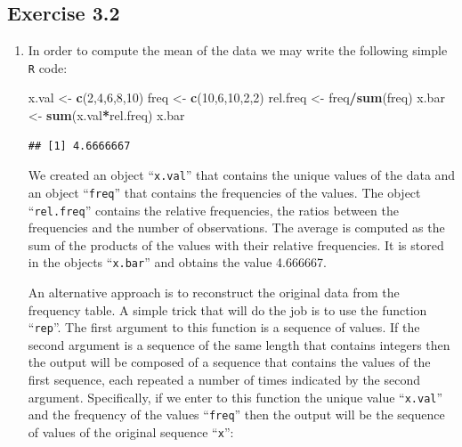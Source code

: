 \documentclass[]{krantz}
\makeatletter
\newenvironment{Shaded}{\begin{snugshade}}{\end{snugshade}}
\newcommand{\KeywordTok}[1]{\textcolor[rgb]{0.13,0.29,0.53}{\textbf{#1}}}
\newcommand{\DecValTok}[1]{\textcolor[rgb]{0.00,0.00,0.81}{#1}}
\newcommand{\StringTok}[1]{\textcolor[rgb]{0.31,0.60,0.02}{#1}}
\newcommand{\OperatorTok}[1]{\textcolor[rgb]{0.81,0.36,0.00}{\textbf{#1}}}
\newcommand{\NormalTok}[1]{#1}
\newenvironment{kframe}{%
\medskip{}
\setlength{\fboxsep}{.8em}
 \def\at@end@of@kframe{}%
 \ifinner\ifhmode%
  \def\at@end@of@kframe{\end{minipage}}%
  \begin{minipage}{\columnwidth}%
 \fi\fi%
 \def\FrameCommand##1{\hskip\@totalleftmargin \hskip-\fboxsep
 \colorbox{shadecolor}{##1}\hskip-\fboxsep
     \hskip-\linewidth \hskip-\@totalleftmargin \hskip\columnwidth}%
 \MakeFramed {\advance\hsize-\width
   \@totalleftmargin\z@ \linewidth\hsize
   \@setminipage}}%
 {\par\unskip\endMakeFramed%
 \at@end@of@kframe}
\renewenvironment{Shaded}{\begin{kframe}}{\end{kframe}}
\theoremstyle{definition}
\theoremstyle{definition}
\theoremstyle{definition}
\theoremstyle{remark}
\makeatother
\begin{document}
\subsection*{Exercise 3.2}\label{exercise-3.2}


\begin{enumerate}
\def\labelenumi{\arabic{enumi}.}
\item
  In order to compute the mean of the data we may write the following
  simple \texttt{R} code:

\begin{Shaded}
\begin{Highlighting}[]
\NormalTok{x.val <-}\StringTok{ }\KeywordTok{c}\NormalTok{(}\DecValTok{2}\NormalTok{,}\DecValTok{4}\NormalTok{,}\DecValTok{6}\NormalTok{,}\DecValTok{8}\NormalTok{,}\DecValTok{10}\NormalTok{)}
\NormalTok{freq <-}\StringTok{ }\KeywordTok{c}\NormalTok{(}\DecValTok{10}\NormalTok{,}\DecValTok{6}\NormalTok{,}\DecValTok{10}\NormalTok{,}\DecValTok{2}\NormalTok{,}\DecValTok{2}\NormalTok{)}
\NormalTok{rel.freq <-}\StringTok{ }\NormalTok{freq}\OperatorTok{/}\KeywordTok{sum}\NormalTok{(freq)}
\NormalTok{x.bar <-}\StringTok{ }\KeywordTok{sum}\NormalTok{(x.val}\OperatorTok{*}\NormalTok{rel.freq)}
\NormalTok{x.bar}
\end{Highlighting}
\end{Shaded}

\begin{verbatim}
## [1] 4.6666667
\end{verbatim}

  We created an object ``\texttt{x.val}'' that contains the unique
  values of the data and an object ``\texttt{freq}'' that contains the
  frequencies of the values. The object ``\texttt{rel.freq}'' contains
  the relative frequencies, the ratios between the frequencies and the
  number of observations. The average is computed as the sum of the
  products of the values with their relative frequencies. It is stored
  in the objects ``\texttt{x.bar}'' and obtains the value 4.666667.

  An alternative approach is to reconstruct the original data from the
  frequency table. A simple trick that will do the job is to use the
  function ``\texttt{rep}''. The first argument to this function is a
  sequence of values. If the second argument is a sequence of the same
  length that contains integers then the output will be composed of a
  sequence that contains the values of the first sequence, each repeated
  a number of times indicated by the second argument. Specifically, if
  we enter to this function the unique value ``\texttt{x.val}'' and the
  frequency of the values ``\texttt{freq}'' then the output will be the
  sequence of values of the original sequence ``\texttt{x}'':


\end{enumerate}
\end{document}

